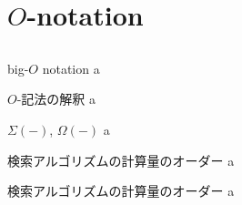 \documentclass{beamer}
\begin{document}
\section{$O$-notation}		%
\subsection{}

\begin{frame}[fragile]{big-$O$ notation}{}
a
\end{frame}

\begin{frame}[fragile]{$O$-記法の解釈}{}
a
\end{frame}

\begin{frame}[fragile]{$\Sigma(-)$, $\Omega(-)$}{}
a
\end{frame}

\begin{frame}[fragile]{検索アルゴリズムの計算量のオーダー}{}
a
\end{frame}

\begin{frame}[fragile]{検索アルゴリズムの計算量のオーダー}{}
a
\end{frame}
\end{document}
